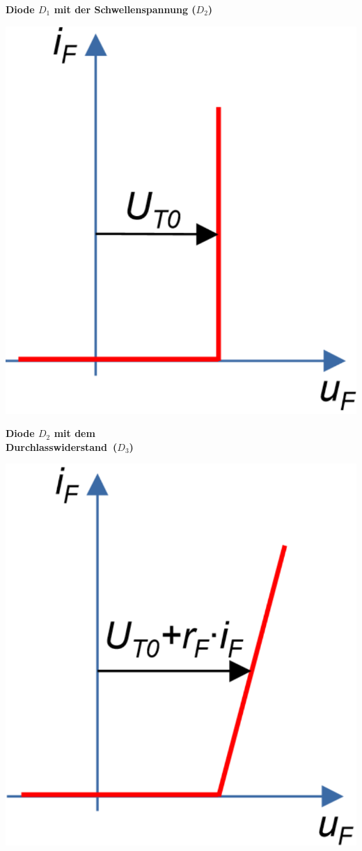 \begin{multicols}{4}
    \begin{minipage}{\linewidth}
        \textbf{Diode $ D_1 $ mit der Schwellenspannung ($  D_2 $)} \raggedright
        \includegraphics[width=0.6\linewidth]{images/idealeDiodeSP}
    \end{minipage}
    
    \begin{minipage}{\linewidth}
        \textbf{Diode $ D_2 $ mit dem \\\mbox{Durchlasswiderstand ($ D_3 $)}} \raggedright
        \includegraphics[width=0.6\linewidth]{images/idealeDiodeSPR}    
    \end{minipage}                       
\end{multicols}
